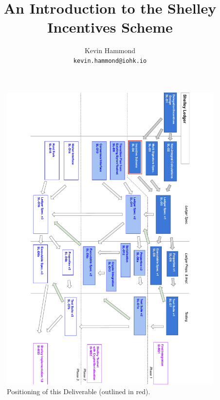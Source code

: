 \documentclass[11pt,a4paper,dvipsnames,twosided,final]{article}
\begin{document}
\begin{landscape}
\begin{figure}
\includegraphics[scale=0.8,angle=90]{d4-depends.pdf}
\caption{Positioning of this Deliverable (outlined in red).}
\end{figure}
\end{landscape}
\pagestyle{empty}
\cleardoublepage


\title{An Introduction to the Shelley Incentives Scheme}

\author{Kevin Hammond  \\ {\small \texttt{kevin.hammond@iohk.io}}}
\end{document}
